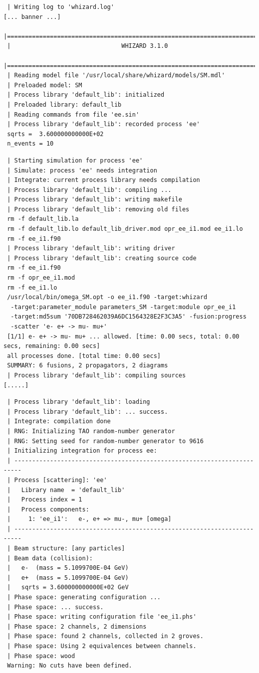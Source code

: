 \documentclass[12pt]{book}
\begin{document}
 \begin{footnotesize}
 \begin{verbatim}
 | Writing log to 'whizard.log'
[... banner ...]
 |=============================================================================|
 |                               WHIZARD 3.1.0
 |=============================================================================|
 | Reading model file '/usr/local/share/whizard/models/SM.mdl'
 | Preloaded model: SM
 | Process library 'default_lib': initialized
 | Preloaded library: default_lib
 | Reading commands from file 'ee.sin'
 | Process library 'default_lib': recorded process 'ee'
 sqrts =  3.600000000000E+02
 n_events = 10
 \end{verbatim}

 \begin{verbatim}
 | Starting simulation for process 'ee'
 | Simulate: process 'ee' needs integration
 | Integrate: current process library needs compilation
 | Process library 'default_lib': compiling ...
 | Process library 'default_lib': writing makefile
 | Process library 'default_lib': removing old files
 rm -f default_lib.la
 rm -f default_lib.lo default_lib_driver.mod opr_ee_i1.mod ee_i1.lo
 rm -f ee_i1.f90
 | Process library 'default_lib': writing driver
 | Process library 'default_lib': creating source code
 rm -f ee_i1.f90
 rm -f opr_ee_i1.mod
 rm -f ee_i1.lo
 /usr/local/bin/omega_SM.opt -o ee_i1.f90 -target:whizard
  -target:parameter_module parameters_SM -target:module opr_ee_i1
  -target:md5sum '70DB728462039A6DC1564328E2F3C3A5' -fusion:progress
  -scatter 'e- e+ -> mu- mu+'
 [1/1] e- e+ -> mu- mu+ ... allowed. [time: 0.00 secs, total: 0.00 secs, remaining: 0.00 secs]
 all processes done. [total time: 0.00 secs]
 SUMMARY: 6 fusions, 2 propagators, 2 diagrams
 | Process library 'default_lib': compiling sources
[.....]
 \end{verbatim}


 \begin{verbatim}
 | Process library 'default_lib': loading
 | Process library 'default_lib': ... success.
 | Integrate: compilation done
 | RNG: Initializing TAO random-number generator
 | RNG: Setting seed for random-number generator to 9616
 | Initializing integration for process ee:
 | ------------------------------------------------------------------------
 | Process [scattering]: 'ee'
 |   Library name  = 'default_lib'
 |   Process index = 1
 |   Process components:
 |     1: 'ee_i1':   e-, e+ => mu-, mu+ [omega]
 | ------------------------------------------------------------------------
 | Beam structure: [any particles]
 | Beam data (collision):
 |   e-  (mass = 5.1099700E-04 GeV)
 |   e+  (mass = 5.1099700E-04 GeV)
 |   sqrts = 3.600000000000E+02 GeV
 | Phase space: generating configuration ...
 | Phase space: ... success.
 | Phase space: writing configuration file 'ee_i1.phs'
 | Phase space: 2 channels, 2 dimensions
 | Phase space: found 2 channels, collected in 2 groves.
 | Phase space: Using 2 equivalences between channels.
 | Phase space: wood
 Warning: No cuts have been defined.
 \end{verbatim}



\end{footnotesize}
\end{document}

